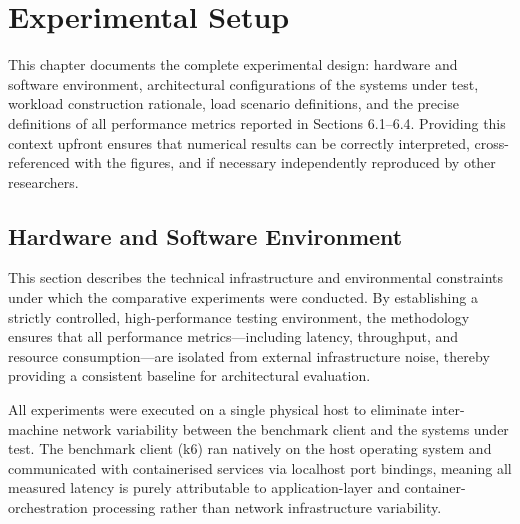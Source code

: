 \chapter{Experimental Setup}

This chapter documents the complete experimental design: hardware and software environment, architectural configurations of the systems under test, workload construction rationale, load scenario definitions, and the precise definitions of all performance metrics reported in Sections 6.1–6.4. Providing this context upfront ensures that numerical results can be correctly interpreted, cross-referenced with the figures, and if necessary independently reproduced by other researchers.

\section{Hardware and Software Environment}

This section describes the technical infrastructure and environmental constraints under which the comparative experiments were conducted. By establishing a strictly controlled, high-performance testing environment, the methodology ensures that all performance metrics—including latency, throughput, and resource consumption—are isolated from external infrastructure noise, thereby providing a consistent baseline for architectural evaluation.

All experiments were executed on a single physical host to eliminate inter-machine network variability between the benchmark client and the systems under test. The benchmark client (k6) ran natively on the host operating system and communicated with containerised services via localhost port bindings, meaning all measured latency is purely attributable to application-layer and container-orchestration processing rather than network infrastructure variability.

